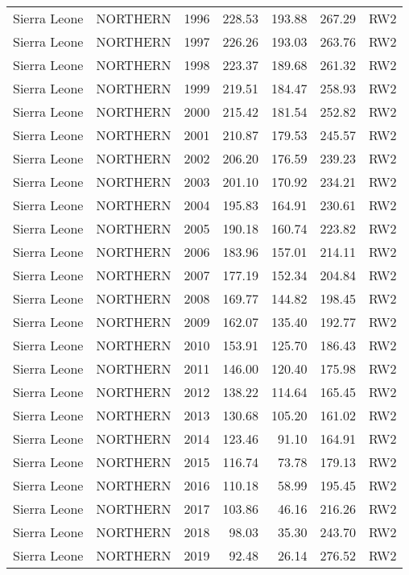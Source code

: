 \begin{longtable}{lllrrrl}
  Sierra Leone & NORTHERN & 1996 & 228.53 & 193.88 & 267.29 & RW2 \\ 
  Sierra Leone & NORTHERN & 1997 & 226.26 & 193.03 & 263.76 & RW2 \\ 
  Sierra Leone & NORTHERN & 1998 & 223.37 & 189.68 & 261.32 & RW2 \\ 
  Sierra Leone & NORTHERN & 1999 & 219.51 & 184.47 & 258.93 & RW2 \\ 
  Sierra Leone & NORTHERN & 2000 & 215.42 & 181.54 & 252.82 & RW2 \\ 
  Sierra Leone & NORTHERN & 2001 & 210.87 & 179.53 & 245.57 & RW2 \\ 
  Sierra Leone & NORTHERN & 2002 & 206.20 & 176.59 & 239.23 & RW2 \\ 
  Sierra Leone & NORTHERN & 2003 & 201.10 & 170.92 & 234.21 & RW2 \\ 
  Sierra Leone & NORTHERN & 2004 & 195.83 & 164.91 & 230.61 & RW2 \\ 
  Sierra Leone & NORTHERN & 2005 & 190.18 & 160.74 & 223.82 & RW2 \\ 
  Sierra Leone & NORTHERN & 2006 & 183.96 & 157.01 & 214.11 & RW2 \\ 
  Sierra Leone & NORTHERN & 2007 & 177.19 & 152.34 & 204.84 & RW2 \\ 
  Sierra Leone & NORTHERN & 2008 & 169.77 & 144.82 & 198.45 & RW2 \\ 
  Sierra Leone & NORTHERN & 2009 & 162.07 & 135.40 & 192.77 & RW2 \\ 
  Sierra Leone & NORTHERN & 2010 & 153.91 & 125.70 & 186.43 & RW2 \\ 
  Sierra Leone & NORTHERN & 2011 & 146.00 & 120.40 & 175.98 & RW2 \\ 
  Sierra Leone & NORTHERN & 2012 & 138.22 & 114.64 & 165.45 & RW2 \\ 
  Sierra Leone & NORTHERN & 2013 & 130.68 & 105.20 & 161.02 & RW2 \\ 
  Sierra Leone & NORTHERN & 2014 & 123.46 & 91.10 & 164.91 & RW2 \\ 
  Sierra Leone & NORTHERN & 2015 & 116.74 & 73.78 & 179.13 & RW2 \\ 
  Sierra Leone & NORTHERN & 2016 & 110.18 & 58.99 & 195.45 & RW2 \\ 
  Sierra Leone & NORTHERN & 2017 & 103.86 & 46.16 & 216.26 & RW2 \\ 
  Sierra Leone & NORTHERN & 2018 & 98.03 & 35.30 & 243.70 & RW2 \\ 
  Sierra Leone & NORTHERN & 2019 & 92.48 & 26.14 & 276.52 & RW2 \\ 

\end{longtable}
